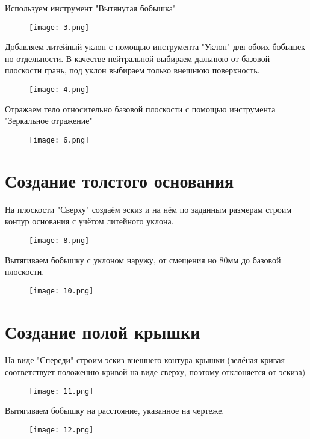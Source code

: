 Используем инструмент "Вытянутая бобышка"
\FloatBarrier
\begin{figure}[ht]
    \centering
    \texttt{[image: 3.png]}
\end{figure}
\FloatBarrier

Добавляем литейный уклон с помощью инструмента "Уклон" для обоих бобышек по отдельности. 
В качестве нейтральной выбираем дальнюю от базовой плоскости грань, под уклон выбираем только внешнюю поверхность.
\FloatBarrier
\begin{figure}[ht]
    \centering
    \texttt{[image: 4.png]}
\end{figure}
\FloatBarrier

Отражаем тело относительно базовой плоскости с помощью инструмента "Зеркальное отражение"
\FloatBarrier
\begin{figure}[ht]
    \centering
    \texttt{[image: 6.png]}
\end{figure}
\FloatBarrier

\section{Создание толстого основания}
На плоскости "Сверху" создаём эскиз и на нём по заданным размерам 
строим контур основания с учётом литейного уклона.
\FloatBarrier
\begin{figure}[ht]
    \centering
    \texttt{[image: 8.png]}
\end{figure}
\FloatBarrier

Вытягиваем бобышку с уклоном наружу, от смещения но 80мм до базовой плоскости.
\FloatBarrier
\begin{figure}[ht]
    \centering
    \texttt{[image: 10.png]}
\end{figure}
\FloatBarrier

\section{Создание полой крышки}
На виде "Спереди" строим эскиз внешнего контура крышки (зелёная кривая соответствует 
положению кривой на виде сверху, поэтому отклоняется от эскиза) 
\FloatBarrier
\begin{figure}[ht]
    \centering
    \texttt{[image: 11.png]}
\end{figure}
\FloatBarrier

Вытягиваем бобышку на расстояние, указанное на чертеже. 
\FloatBarrier
\begin{figure}[ht]
    \centering
    \texttt{[image: 12.png]}
\end{figure}
\FloatBarrier


